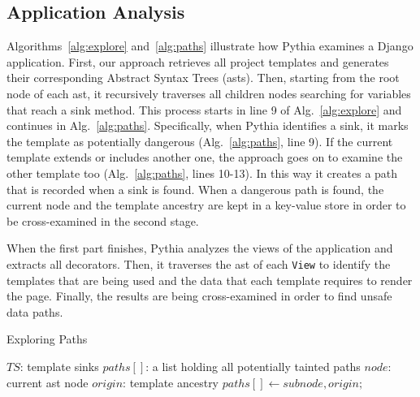 \subsection{Application Analysis}
\label{sec:analysis}

Algorithms~\ref{alg:explore}
and~\ref{alg:paths} illustrate
how Pythia examines a Django application.
First,
our approach retrieves all project templates
and generates their corresponding
Abstract Syntax Trees ({\sc ast}s).
Then,
starting from the root node of each {\sc ast},
it recursively traverses all children
nodes searching for variables that
reach a sink method.
This process starts in line 9
of Alg.~\ref{alg:explore} and continues
in Alg.~\ref{alg:paths}.
Specifically,
when Pythia identifies a sink,
it marks the template as potentially
dangerous (Alg.~\ref{alg:paths}, line 9).
If the current template extends or
includes another one,
the approach goes on to examine
the other template too
(Alg.~\ref{alg:paths}, lines 10-13).
In this way it creates a path that
is recorded when a sink is found.
When a dangerous path is found, the current node 
and the template ancestry are kept in a key-value store in 
order to be cross-examined in the second stage.

When the first part finishes,
Pythia analyzes the views of the application
and extracts all decorators.
Then,
it traverses the {\sc ast} of each {\tt View}
to identify the templates that are being used
and the data that each template requires 
to render the page.
Finally,
the results are 
being cross-examined in order to find
unsafe data paths.

\begin{algorithm}[ht]
\caption{Exploring Paths}
\label{alg:paths}
\begin{algorithmic}[1]
 $TS$: template sinks
 $paths[]$: a list holding all
potentially tainted paths
 $node$: current {\sc ast} node
 $origin$: template ancestry
            \State $paths[] \gets subnode, origin;$
        \EndIf
\EndIf
\EndFor
\EndFunction
\end{algorithmic}
\end{algorithm}

